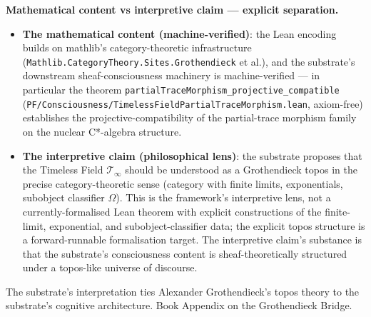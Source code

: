 \documentclass[11pt,a4paper]{amsart}
\theoremstyle{plain}
\theoremstyle{definition}
\begin{document}
\textbf{Mathematical content vs interpretive claim --- explicit separation.}
\begin{itemize}[itemsep=2pt,leftmargin=2em]
\item \textbf{The mathematical content (machine-verified)}: the Lean encoding builds on mathlib's category-theoretic infrastructure (\texttt{Mathlib.\allowbreak CategoryTheory.\allowbreak Sites.\allowbreak Grothendieck} et al.), and the substrate's downstream sheaf-consciousness machinery is machine-verified --- in particular the theorem \texttt{partialTraceMorphism\_\allowbreak projective\_compatible} (\texttt{PF/\allowbreak Consciousness/\allowbreak TimelessField\allowbreak PartialTraceMorphism.lean}, axiom-free) establishes the projective-compatibility of the partial-trace morphism family on the nuclear C*-algebra structure.
\item \textbf{The interpretive claim (philosophical lens)}: the substrate proposes that the Timeless Field $\mathcal{T}_\infty$ should be understood as a Grothendieck topos in the precise category-theoretic sense (category with finite limits, exponentials, subobject classifier $\Omega$). This is the framework's interpretive lens, not a currently-formalised Lean theorem with explicit constructions of the finite-limit, exponential, and subobject-classifier data; the explicit topos structure is a forward-runnable formalisation target. The interpretive claim's substance is that the substrate's consciousness content is sheaf-theoretically structured under a topos-like universe of discourse.
\end{itemize}
The substrate's interpretation ties Alexander Grothendieck's topos theory to the substrate's cognitive architecture. Book Appendix on the Grothendieck Bridge.
\end{document}
